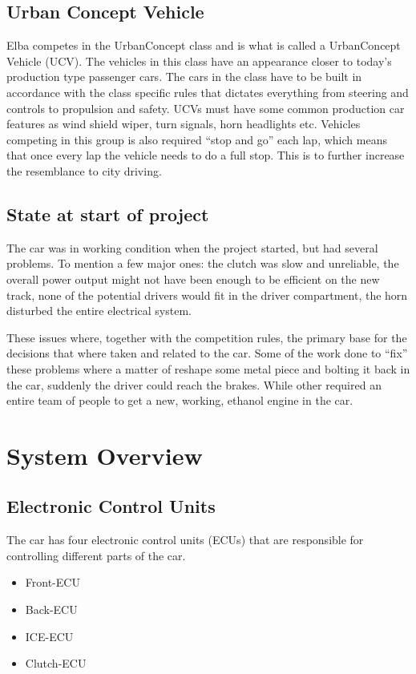 \subsection{Urban Concept Vehicle}\label{UCV}
Elba competes in the UrbanConcept class and is what is called a UrbanConcept
Vehicle (UCV). The vehicles in this class have an appearance closer to today's
production type passenger cars. The cars in the class have to be built in
accordance with the class specific rules that dictates everything from steering
and controls to propulsion and safety. UCVs must have some common production
car features as wind shield wiper, turn signals, horn headlights etc. Vehicles
competing in this group is also required ``stop and go'' each lap, which means
that once every lap the vehicle needs to do a full stop. This is to further
increase the resemblance to city driving.

\subsection{State at start of project}
The car was in working condition when the project started, but had several
problems. To mention a few major ones: the clutch was slow and unreliable,
the overall power output might not have been enough to be efficient on the new
track, none of the potential drivers would fit in the driver compartment, the
horn disturbed the entire electrical system.

These issues where, together with the competition rules, the primary base for
the decisions that where taken and related to the car. Some of the work done to
``fix'' these problems where a matter of reshape some metal piece and bolting it
back in the car, suddenly the driver could reach the brakes. While other
required an entire team of people to get a new, working, ethanol engine in the
car.

\section{System Overview}
\subsection{Electronic Control Units}
The car has four electronic control units (ECUs) that are responsible for
controlling different parts of the car.

\begin{itemize}
\item Front-ECU
\item Back-ECU
\item ICE-ECU
\item Clutch-ECU
\end{itemize}

